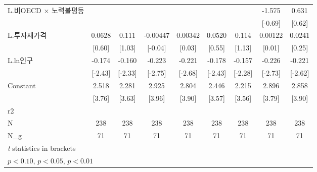 \begin{tabular}{l*{8}{c}}
\addlinespace
L.비OECD $\times$ 노력불평등&                     &                     &                     &                     &                     &                     &      -1.575         &       0.631         \\
                    &                     &                     &                     &                     &                     &                     &     [-0.69]         &      [0.62]         \\
\addlinespace
L.투자재가격        &      0.0628         &       0.111         &    -0.00447         &     0.00342         &      0.0520         &       0.114         &     0.00122         &      0.0241         \\
                    &      [0.60]         &      [1.03]         &     [-0.04]         &      [0.03]         &      [0.55]         &      [1.13]         &      [0.01]         &      [0.25]         \\
\addlinespace
L.ln인구            &      -0.174\sym{**} &      -0.160\sym{**} &      -0.223\sym{***}&      -0.221\sym{***}&      -0.178\sym{**} &      -0.157\sym{**} &      -0.226\sym{***}&      -0.221\sym{***}\\
                    &     [-2.43]         &     [-2.33]         &     [-2.75]         &     [-2.68]         &     [-2.43]         &     [-2.28]         &     [-2.73]         &     [-2.62]         \\
\addlinespace
Constant            &       2.518\sym{***}&       2.281\sym{***}&       2.925\sym{***}&       2.804\sym{***}&       2.446\sym{***}&       2.215\sym{***}&       2.896\sym{***}&       2.858\sym{***}\\
                    &      [3.76]         &      [3.63]         &      [3.96]         &      [3.90]         &      [3.57]         &      [3.56]         &      [3.79]         &      [3.90]         \\
\midrule
r2                  &                     &                     &                     &                     &                     &                     &                     &                     \\
N                   &         238         &         238         &         238         &         238         &         238         &         238         &         238         &         238         \\
N\_g                 &          71         &          71         &          71         &          71         &          71         &          71         &          71         &          71         \\
\bottomrule
\multicolumn{9}{l}{\footnotesize \textit{t} statistics in brackets}\\
\multicolumn{9}{l}{\footnotesize \sym{*} \(p<0.10\), \sym{**} \(p<0.05\), \sym{***} \(p<0.01\)}\\
\end{tabular}